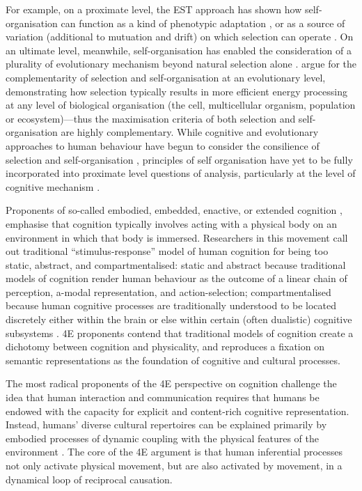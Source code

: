 \begin{CJK}{UTF8}{gbsn}
For example, on a proximate level, the EST approach has shown how self-organisation can function as a kind of phenotypic adaptation \citep[by facilitating phenotypic plasticity and adaptability][]{Lewis2000}, or as a source of variation (additional to mutuation and drift) on which selection can operate \citep[in addition to ][]{Ploeger2008}. On an ultimate level, meanwhile, self-organisation has enabled the consideration of a plurality of evolutionary mechanism beyond natural selection alone \citep{Kauffman1993,Carporael2001}.  \textcite{Hoelzer2006} argue for the complementarity of selection and self-organisation at an evolutionary level, demonstrating how selection typically results in more efficient energy processing at any level of biological organisation (the cell, multicellular organism, population or ecosystem)---thus the maximisation criteria of both selection and self-organisation are highly complementary.  While cognitive and evolutionary approaches to human behaviour have begun to consider the consilience of selection and self-organisation \citep{Lansing2003,Claidiere2007,Claidiere2014}, principles of self organisation have yet to be fully incorporated into proximate level questions of analysis, particularly at the level of cognitive mechanism \citep{Badcock2012}.


Proponents of so-called embodied, embedded, enactive, or extended cognition \citep[now collectively referred to as ``4E cognition,'' see][]{Menary2010}, emphasise that cognition typically involves acting with a physical body on an environment in which that body is immersed.  Researchers in this movement call out traditional ``stimulus-response'' model of human cognition for being too static, abstract, and compartmentalised: static and abstract because traditional models of cognition render human behaviour as the outcome of a linear chain of perception, a-modal representation, and action-selection; compartmentalised because human cognitive processes are traditionally understood to be located discretely either within the brain or else within certain (often dualistic) cognitive subsystems \citep[e.g., emotional and cognitive, System 1 (fast) and System 2 (slow), implicit and explicit, and so on; see][]{Diennes1999,Kahneman2011}.  4E proponents contend that traditional models of cognition create a dichotomy between cognition and physicality, and reproduces a fixation on semantic representations as the foundation of cognitive and cultural processes.

The most radical proponents of the 4E perspective on cognition challenge the idea that human interaction and communication requires that humans be endowed with the capacity for explicit and content-rich cognitive representation.  Instead, humans' diverse cultural repertoires can be explained primarily by embodied processes of dynamic coupling with the physical features of the environment \citep{Gallagher2001,Gallagher2008,Fuchs2009}.  The core of the 4E argument is that human inferential processes not only activate physical movement, but are also activated by movement, in a dynamical loop of reciprocal causation.


\end{CJK}
